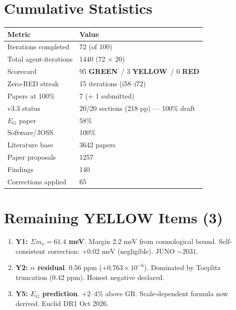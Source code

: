 \documentclass[11pt,a4paper]{article}
\newcommand{\GREEN}{\textcolor{dfdgreen}{\textbf{GREEN}}}
\newcommand{\YELLOW}{\textcolor{dfdyellow}{\textbf{YELLOW}}}
\newcommand{\RED}{\textcolor{dfdred}{\textbf{RED}}}
\begin{document}
\section{Cumulative Statistics}

\begin{center}
\begin{tabular}{ll}
\toprule
\textbf{Metric} & \textbf{Value} \\
\midrule
Iterations completed & 72 (of 100) \\
Total agent-iterations & 1440 (72 $\times$ 20) \\
Scorecard & 95 \GREEN\ / 3 \YELLOW\ / 0 \RED \\
Zero-RED streak & 15 iterations (i58--i72) \\
Papers at 100\% & 7 (+ 1 submitted) \\
v3.3 status & 20/20 sections (218 pp) --- 100\% draft \\
$E_G$ paper & 58\% \\
Software/JOSS & 100\% \\
Literature base & 3642 papers \\
Paper proposals & 1257 \\
Findings & 140 \\
Corrections applied & 65 \\
\bottomrule
\end{tabular}
\end{center}

\section{Remaining YELLOW Items (3)}

\begin{enumerate}
\item \textbf{Y1: $\Sigma m_\nu = 61.4$ meV}. Margin 2.2 meV from cosmological bound. Self-consistent correction: $+0.02$ meV (negligible). JUNO $\sim 2031$.
\item \textbf{Y2: $\alpha$ residual}. $0.56$ ppm ($+0.763 \times 10^{-6}$). Dominated by Toeplitz truncation ($0.42$ ppm). Honest negative declared.
\item \textbf{Y5: $E_G$ prediction}. $+2$--$4\%$ above GR. Scale-dependent formula now derived. Euclid DR1 Oct 2026.
\end{enumerate}
\end{document}
